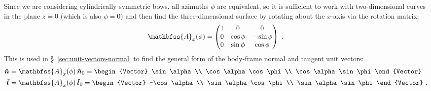 Since we are considering cylindrically symmetric bows, all azimuths
\(\phi\) are equivalent, so it is sufficient to work with two-dimensional
curves in the plane \(z = 0\) (which is also \(\phi = 0\)) and then find
the three-dimensional surface by rotating about the \(x\)-axis via the
rotation matrix:
\begin{equation}
  \label{eq:Rotation-matrix-x}
  \mathbfss{A}_x(\phi) = 
   \begin{pmatrix}
    1 & 0 & 0 \\
    0 &\cos\phi & -\sin\phi \\
    0 &\sin\phi & \cos\phi 
  \end{pmatrix} \ .
\end{equation}
This is used in \S~\ref{sec:unit-vectors-normal} to find the general
form of the body-frame normal and tangent unit vectors:
\begin{align}
  \uvec{n} &= \mathbfss{A}_x(\phi) \, \uvec{n}_0 =
  \begin{Vector}
    \sin\alpha \\ \cos\alpha\cos\phi \\ \cos\alpha\sin\phi
  \end{Vector} \\
  \uvec{t} &= \mathbfss{A}_x(\phi) \, \uvec{t}_0 =
  \begin{Vector}
    -\cos\alpha \\ \sin\alpha\cos\phi \\ \sin\alpha\sin\phi
  \end{Vector} \ . 
\end{align}



